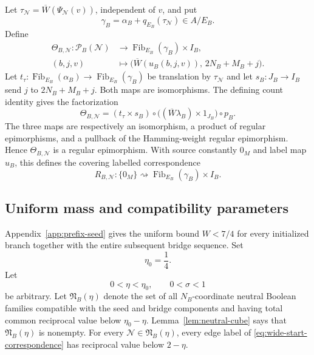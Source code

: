 Let $\tau_{\mathscr N}=\overline W(\Psi_{\mathscr N}(v))$, independent of $v$, and put
\begin{equation}\label{eq:full-centre}
\gamma_B=\alpha_B+q_{E_B}(\tau_{\mathscr N})\in A/E_B.
\end{equation}
Define
\begin{equation}\label{eq:wide-start-target-map}
\begin{aligned}
\Theta_{B,\mathscr N}:\mathcal P_B(\mathscr N)
&\longrightarrow \operatorname{Fib}_{E_B}(\gamma_B)\times I_B,\\
(b,j,v)&\longmapsto
\bigl(\overline W(u_B(b,j,v)),\,2N_B+M_B+j\bigr).
\end{aligned}
\end{equation}
Let $t_\tau:\operatorname{Fib}_{E_B}(\alpha_B)\to\operatorname{Fib}_{E_B}(\gamma_B)$ be translation by $\tau_{\mathscr N}$ and let $s_B:J_B\to I_B$ send $j$ to $2N_B+M_B+j$.  Both maps are isomorphisms.  The defining count identity gives the factorization
\[
\Theta_{B,\mathscr N}
=(t_\tau\times s_B)
\circ\bigl((\overline W\lambda_B)\times1_{J_B}\bigr)
\circ p_B.
\]
The three maps are respectively an isomorphism, a product of regular epimorphisms, and a pullback of the Hamming-weight regular epimorphism.  Hence $\Theta_{B,\mathscr N}$ is a regular epimorphism.  With source constantly $0_M$ and label map $u_B$, this defines the covering labelled correspondence
\begin{equation}\label{eq:wide-start-correspondence}
R_{B,\mathscr N}:\{0_M\}\rightsquigarrow
\operatorname{Fib}_{E_B}(\gamma_B)\times I_B.
\end{equation}
\subsection{Uniform mass and compatibility parameters}

Appendix~\ref{app:prefix-seed} gives the uniform bound $W<7/4$ for every initialized branch together with the entire subsequent bridge sequence.  Set
\begin{equation}\label{eq:canonical-mass-margin}
\eta_0=\frac14.
\end{equation}
Let
\[
0<\eta<\eta_0,
\qquad
0<\sigma<1
\]
be arbitrary.  Let $\mathfrak N_B(\eta)$ denote the set of all $N_B$-coordinate neutral Boolean families compatible with the seed and bridge components and having total common reciprocal value below $\eta_0-\eta$.  Lemma~\ref{lem:neutral-cube} says that $\mathfrak N_B(\eta)$ is nonempty.  For every $\mathscr N\in\mathfrak N_B(\eta)$, every edge label of \eqref{eq:wide-start-correspondence} has reciprocal value below $2-\eta$.


